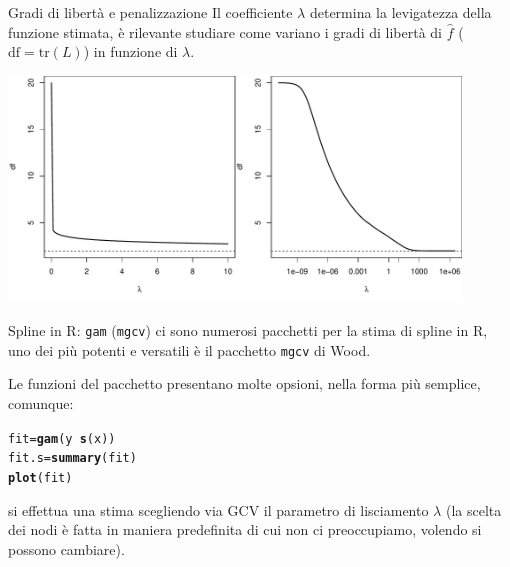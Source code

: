\documentclass{beamer}\usepackage[]{graphicx}\usepackage[]{color}
\makeatletter
\newcommand{\hlopt}[1]{\textcolor[rgb]{0,0,0}{#1}}%
\newcommand{\hlstd}[1]{\textcolor[rgb]{0.345,0.345,0.345}{#1}}%
\newcommand{\hlkwb}[1]{\textcolor[rgb]{0.69,0.353,0.396}{#1}}%
\newcommand{\hlkwd}[1]{\textcolor[rgb]{0.737,0.353,0.396}{\textbf{#1}}}%
\newenvironment{kframe}{%
 \def\at@end@of@kframe{}%
 \ifinner\ifhmode%
  \def\at@end@of@kframe{\end{minipage}}%
  \begin{minipage}{\columnwidth}%
 \fi\fi%
 \def\FrameCommand##1{\hskip\@totalleftmargin \hskip-\fboxsep
 \colorbox{shadecolor}{##1}\hskip-\fboxsep
     \hskip-\linewidth \hskip-\@totalleftmargin \hskip\columnwidth}%
 \MakeFramed {\advance\hsize-\width
   \@totalleftmargin\z@ \linewidth\hsize
   \@setminipage}}%
 {\par\unskip\endMakeFramed%
 \at@end@of@kframe}
\newenvironment{knitrout}{}{} %
\newcommand{\spazio}{\noindent\makebox[\linewidth]{\resizebox{0.1\linewidth}{1pt}{{$\bullet$}}}}
\makeatother
\begin{document}
\begin{frame}{Gradi di libert\`a e penalizzazione}
Il coefficiente $\lambda$ determina la levigatezza della funzione stimata, \`e rilevante studiare come variano i gradi di libert\`a di $\hat{f}$ ( $\mbox{df}=\mbox{tr}(L)$) in funzione di $\lambda$.

\begin{knitrout}
\color{fgcolor}

{\centering \includegraphics[width=0.9\textwidth]{figure/020-regression-1unnamed-chunk-25-1} 

}



\end{knitrout}


\end{frame}



\begin{frame}[fragile]{Spline in R: {\tt gam} ({\tt mgcv})}
ci sono numerosi pacchetti per la stima di spline in R, uno dei pi\`u potenti e versatili \`e il pacchetto {\tt mgcv} di Wood.

\spazio

Le funzioni del pacchetto presentano molte opsioni, nella forma pi\`u semplice, comunque:

\begin{knitrout}
\color{fgcolor}\begin{kframe}
\begin{alltt}
\hlstd{fit}\hlkwb{=}\hlkwd{gam}\hlstd{(y}\hlopt{~}\hlkwd{s}\hlstd{(x))}
\hlstd{fit.s}\hlkwb{=}\hlkwd{summary}\hlstd{(fit)}
\hlkwd{plot}\hlstd{(fit)}
\end{alltt}
\end{kframe}
\end{knitrout}

si effettua una stima scegliendo via GCV il parametro di lisciamento $\lambda$ (la scelta dei nodi \`e fatta in maniera predefinita di cui non ci preoccupiamo, volendo si possono cambiare).
\end{frame}
\end{document}
